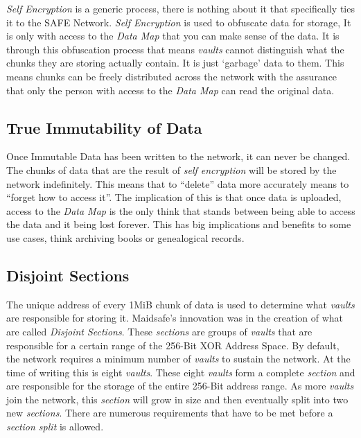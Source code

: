 \textit{Self Encryption} is a generic process, there is nothing about it that specifically ties it to the SAFE Network. \textit{Self Encryption} is used to obfuscate data for storage, It is only with access to the \textit{Data Map} that you can make sense of the data. It is through this obfuscation process that means \textit{vaults} cannot distinguish what the chunks they are storing actually contain. It is just `garbage' data to them. This means chunks can be freely distributed across the network with the assurance that only the person with access to the \textit{Data Map} can read the original data.

\subsection{True Immutability of Data}
\label{subsec:immutability-of-data}

Once Immutable Data has been written to the network, it can never be changed. The chunks of data that are the result of \textit{self encryption} will be stored by the network indefinitely. This means that to ``delete'' data more accurately means to ``forget how to access it''. The implication of this is that once data is uploaded, access to the \textit{Data Map} is the only think that stands between being able to access the data and it being lost forever. This has big implications and benefits to some use cases, think archiving books or genealogical records.

\subsection{Disjoint Sections}

The unique address of every 1MiB chunk of data is used to determine what \textit{vaults} are responsible for storing it. Maidsafe's innovation was in the creation of what are called \textit{Disjoint Sections}. These \textit{sections} are groups of \textit{vaults} that are responsible for a certain range of the 256-Bit XOR Address Space. By default, the network requires a minimum number of \textit{vaults} to sustain the network. At the time of writing this is eight \textit{vaults}. These eight \textit{vaults} form a complete \textit{section} and are responsible for the storage of the entire 256-Bit address range. As more \textit{vaults} join the network, this \textit{section} will grow in size and then eventually split into two new \textit{sections}. There are numerous requirements that have to be met before a \textit{section split} is allowed.

